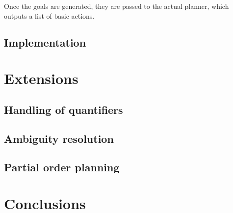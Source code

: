 \documentclass[11pt]{article}
\begin{document}
	Once the goals are generated, they are passed to the actual planner, which 
	outputs a list of basic actions.

	\subsection{Implementation}


	\section{Extensions}

	\subsection{Handling of quantifiers}
	\subsection{Ambiguity resolution}
	\subsection{Partial order planning}

	\section{Conclusions}
\end{document}

